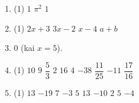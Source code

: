 \documentclass[12pt, a4paper]{article}
\begin{document}
\begin{enumerate}[label=\textbf{\arabic* užduotis.}, leftmargin=*]
    \item
    \begin{tasks}[label={(\arabic*)}, label-offset=0.9em](1)
        \task $1$
        \task $\pi^2$
        \task $1$
    \end{tasks}
    \item
    \begin{tasks}[label={(\arabic*)}, label-offset=0.9em](1)
        \task $2x+3$
        \task $3x-2$
        \task $x-4$
        \task $a+b$
    \end{tasks}
    \item $0$ (kai $x=5$).
    \item
    \begin{tasks}[label={(\arabic*)}, label-offset=0.9em](1)
        \task $10$
        \task $9$
        \task $\dfrac{5}{3}$
        \task $2$
        \task $16$
        \task $4$
        \task $-38$
        \task $\dfrac{11}{25}$
        \task $-11$
        \task $\dfrac{17}{16}$
    \end{tasks}
    \item
    \begin{tasks}[label={(\arabic*)}, label-offset=0.9em](1)
        \task $13$
        \task $-19$
        \task $7$
        \task $-3$
        \task $5$
        \task $13$
        \task $-10$
        \task $2$
        \task $5$
        \task $-4$
    \end{tasks}
\end{enumerate}
\end{document}
